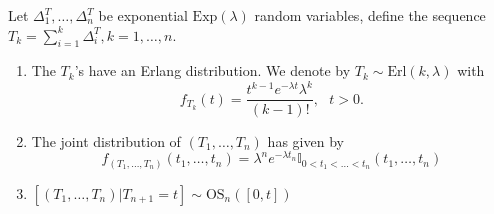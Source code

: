 \begin{prop}\label{prop:erlang_dist}
Let $\Delta^T_1,\ldots, \Delta^T_n$ be \iid exponential $\text{Exp}(\lambda)$ random variables, define the sequence $T_k=\sum_{i=1}^{k}\Delta^T_i, k=1,\ldots, n$.
\begin{enumerate}
\item The $T_{k}$'s have an Erlang distribution. We denote by $T_{k}\sim\text{Erl}(k,\lambda)$ with 
$$
f_{T_k}(t)=\frac{t^{k-1}e^{-\lambda t}\lambda^k}{(k-1)!},\text{ }t>0.
$$
\item The joint distribution of $(T_1,\ldots, T_n)$ has \pmf given by
$$
f_{(T_1,\ldots, T_n)}(t_1,\ldots, t_n)=\lambda^n e^{-\lambda t_n }\mathbb{I}_{0<t_1<\ldots< t_n}(t_1,\ldots, t_n)
$$
\item $[(T_1,\ldots, T_n)|T_{n+1}=t]\sim \text{OS}_{n}([0,t])$
\end{enumerate}
\end{prop}
